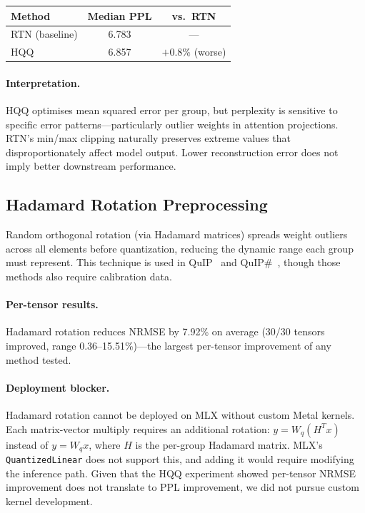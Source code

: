 \documentclass{article}
\begin{document}
\begin{center}
\begin{tabular}{lcc}
\toprule
\textbf{Method} & \textbf{Median PPL} & \textbf{vs.\ RTN} \\
\midrule
RTN (baseline) & 6.783 & --- \\
HQQ & 6.857 & $+$0.8\% (worse) \\
\bottomrule
\end{tabular}
\end{center}

\paragraph{Interpretation.} HQQ optimises mean squared error per group, but perplexity is sensitive to specific error patterns---particularly outlier weights in attention projections. RTN's min/max clipping naturally preserves extreme values that disproportionately affect model output. Lower reconstruction error does not imply better downstream performance.

\subsection{Hadamard Rotation Preprocessing}

Random orthogonal rotation (via Hadamard matrices) spreads weight outliers across all elements before quantization, reducing the dynamic range each group must represent. This technique is used in QuIP~\cite{chee2024quip} and QuIP\#~\cite{tseng2024quip_sharp}, though those methods also require calibration data.

\paragraph{Per-tensor results.} Hadamard rotation reduces NRMSE by 7.92\% on average (30/30 tensors improved, range 0.36--15.51\%)---the largest per-tensor improvement of any method tested.

\paragraph{Deployment blocker.} Hadamard rotation cannot be deployed on MLX without custom Metal kernels. Each matrix-vector multiply requires an additional rotation: $y = W_q (H^T x)$ instead of $y = W_q x$, where $H$ is the per-group Hadamard matrix. MLX's \texttt{QuantizedLinear} does not support this, and adding it would require modifying the inference path. Given that the HQQ experiment showed per-tensor NRMSE improvement does not translate to PPL improvement, we did not pursue custom kernel development.
\end{document}
